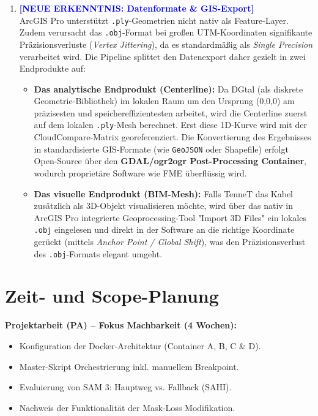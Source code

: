 \documentclass[12pt,a4paper]{article}
\begin{document}
\begin{enumerate}
    \item \textcolor{blue}{\textbf{[NEUE ERKENNTNIS: Datenformate \& GIS-Export]}} \\
          ArcGIS Pro unterstützt \texttt{.ply}-Geometrien nicht nativ als Feature-Layer. Zudem verursacht das \texttt{.obj}-Format bei großen UTM-Koordinaten signifikante Präzisionsverluste (\textit{Vertex Jittering}), da es standardmäßig als \textit{Single Precision} verarbeitet wird. Die Pipeline splittet den Datenexport daher gezielt in zwei Endprodukte auf:
          \begin{itemize}
              \item \textbf{Das analytische Endprodukt (Centerline):} Da DGtal (als diskrete Geometrie-Bibliothek) im lokalen Raum um den Ursprung (0,0,0) am präzisesten und speichereffizientesten arbeitet, wird die Centerline zuerst auf dem lokalen \texttt{.ply}-Mesh berechnet. Erst diese 1D-Kurve wird mit der CloudCompare-Matrix georeferenziert. Die Konvertierung des Ergebnisses in standardisierte GIS-Formate (wie \texttt{GeoJSON} oder Shapefile) erfolgt Open-Source über den \textbf{GDAL/ogr2ogr Post-Processing Container}, wodurch proprietäre Software wie FME überflüssig wird.
              \item \textbf{Das visuelle Endprodukt (BIM-Mesh):} Falls TenneT das Kabel zusätzlich als 3D-Objekt visualisieren möchte, wird über das nativ in ArcGIS Pro integrierte Geoprocessing-Tool "Import 3D Files" ein lokales \texttt{.obj} eingelesen und direkt in der Software an die richtige Koordinate gerückt (mittels \textit{Anchor Point / Global Shift}), was den Präzisionsverlust des \texttt{.obj}-Formats elegant umgeht.
          \end{itemize}
\end{enumerate}

\section{Zeit- und Scope-Planung}
\vspace{0.3cm}
\noindent\textbf{Projektarbeit (PA) -- Fokus Machbarkeit (4 Wochen):}
\begin{itemize}[noitemsep]
    \item Konfiguration der Docker-Architektur (Container A, B, C \& D).
    \item Master-Skript Orchestrierung inkl. manuellem Breakpoint.
    \item Evaluierung von SAM 3: Hauptweg vs. Fallback (SAHI).
    \item Nachweis der Funktionalität der Mask-Loss Modifikation.
\end{itemize}
\end{document}
